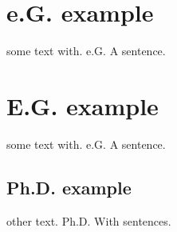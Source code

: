 \section{e.G. example}
some text with.
e.G. A sentence.

\section{E.G. example}
some text with.
e.G. A sentence.

\subsection{Ph.D. example}
other text.
Ph.D. With sentences.

